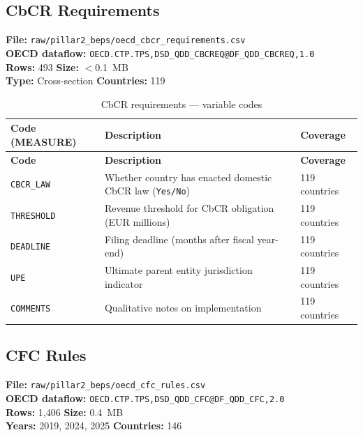 \documentclass[11pt,a4paper]{article}
\begin{document}
\subsection{CbCR Requirements}
\label{subsec:beps_cbcr_req}

\textbf{File:} \texttt{raw/pillar2\_beps/oecd\_cbcr\_requirements.csv}\\
\textbf{OECD dataflow:} \texttt{OECD.CTP.TPS,DSD\_QDD\_CBCREQ@DF\_QDD\_CBCREQ,1.0}\\
\textbf{Rows:} 493 \quad \textbf{Size:} $<$0.1~MB\\
\textbf{Type:} Cross-section \quad \textbf{Countries:} 119

\begin{longtable}{L{2.8cm} L{7.5cm} C{2.5cm}}
    \caption{CbCR requirements --- variable codes}
    \label{tab:cbcr_req}\\
    \toprule
    \textbf{Code (MEASURE)} & \textbf{Description} & \textbf{Coverage} \\
    \midrule
    \endfirsthead
    \toprule
    \textbf{Code} & \textbf{Description} & \textbf{Coverage} \\
    \midrule
    \endhead
    \bottomrule
    \endlastfoot
    \texttt{CBCR\_LAW}   & Whether country has enacted domestic CbCR law (\texttt{Yes/No}) & 119 countries \\
    \texttt{THRESHOLD}   & Revenue threshold for CbCR obligation (EUR millions) & 119 countries \\
    \texttt{DEADLINE}    & Filing deadline (months after fiscal year-end) & 119 countries \\
    \texttt{UPE}         & Ultimate parent entity jurisdiction indicator & 119 countries \\
    \texttt{COMMENTS}    & Qualitative notes on implementation & 119 countries \\
\end{longtable}

\subsection{CFC Rules}
\label{subsec:beps_cfc}

\textbf{File:} \texttt{raw/pillar2\_beps/oecd\_cfc\_rules.csv}\\
\textbf{OECD dataflow:} \texttt{OECD.CTP.TPS,DSD\_QDD\_CFC@DF\_QDD\_CFC,2.0}\\
\textbf{Rows:} 1{,}406 \quad \textbf{Size:} 0.4~MB\\
\textbf{Years:} 2019, 2024, 2025 \quad \textbf{Countries:} 146
\end{document}
